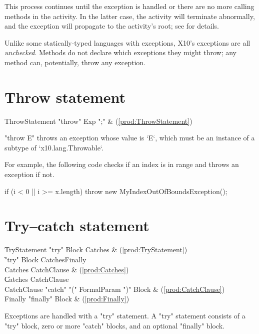 This process continues until the exception is handled or there are no more
calling methods in the activity. In the latter case, the activity will
terminate abnormally, and the exception will propagate to the activity's root;
see  for details.

Unlike some statically-typed languages with exceptions, X10's exceptions are
all {\em unchecked}. Methods do not declare which exceptions they might throw;
any method can, potentially, throw any exception.


\section{Throw statement}

\begin{bbgrammar}
 ThrowStatement    \: \xcd"throw" Exp \xcd";" & (\ref{prod:ThrowStatement})\\%
\end{bbgrammar}


\xcd"throw E" throws an exception whose value is \xcd`E`, which must be an
instance of a subtype of \xcd`x10.lang.Throwable`. 

For example, the following code checks if an index is in range and
throws an exception if not.

\begin{xten}
if (i < 0 || i >= x.length)
    throw new MyIndexOutOfBoundsException();
\end{xten}

\section{Try--catch statement}
\begin{bbgrammar}
 TryStatement    \: \xcd"try" Block Catches & (\ref{prod:TryStatement})\\%
    \| \xcd"try" Block Catches\opt Finally\\
 Catches    \: CatchClause & (\ref{prod:Catches})\\%
    \| Catches CatchClause\\
 CatchClause    \: \xcd"catch" \xcd"(" FormalParam \xcd")" Block & (\ref{prod:CatchClause})\\%
 Finally    \: \xcd"finally" Block & (\ref{prod:Finally})\\%

\end{bbgrammar}
Exceptions are handled with a \xcd"try" statement.
A \xcd"try" statement consists of a \xcd"try" block, zero or more
\xcd"catch" blocks, and an optional \xcd"finally" block.

